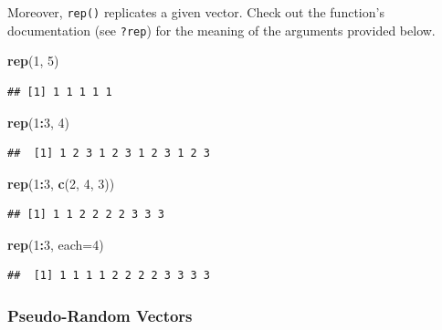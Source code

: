 \documentclass[10pt,b5paper,krantz1]{krantz}
\newenvironment{Shaded}{\begin{snugshade}}{\end{snugshade}}
\newcommand{\DataTypeTok}[1]{\textcolor[rgb]{0.27,0.27,0.27}{#1}}
\newcommand{\DecValTok}[1]{\textcolor[rgb]{0.06,0.06,0.06}{#1}}
\newcommand{\KeywordTok}[1]{\textcolor[rgb]{0.27,0.27,0.27}{\textbf{#1}}}
\newcommand{\NormalTok}[1]{#1}
\newcommand{\OperatorTok}[1]{\textcolor[rgb]{0.43,0.43,0.43}{\textbf{#1}}}
\begin{document}
Moreover, \texttt{rep()} replicates a given vector.
Check out the function's documentation (see \texttt{?rep}) for
the meaning of the arguments provided below.

\begin{Shaded}
\begin{Highlighting}[]
\KeywordTok{rep}\NormalTok{(}\DecValTok{1}\NormalTok{, }\DecValTok{5}\NormalTok{)}
\end{Highlighting}
\end{Shaded}

\begin{verbatim}
## [1] 1 1 1 1 1
\end{verbatim}

\begin{Shaded}
\begin{Highlighting}[]
\KeywordTok{rep}\NormalTok{(}\DecValTok{1}\OperatorTok{:}\DecValTok{3}\NormalTok{, }\DecValTok{4}\NormalTok{)}
\end{Highlighting}
\end{Shaded}

\begin{verbatim}
##  [1] 1 2 3 1 2 3 1 2 3 1 2 3
\end{verbatim}

\begin{Shaded}
\begin{Highlighting}[]
\KeywordTok{rep}\NormalTok{(}\DecValTok{1}\OperatorTok{:}\DecValTok{3}\NormalTok{, }\KeywordTok{c}\NormalTok{(}\DecValTok{2}\NormalTok{, }\DecValTok{4}\NormalTok{, }\DecValTok{3}\NormalTok{))}
\end{Highlighting}
\end{Shaded}

\begin{verbatim}
## [1] 1 1 2 2 2 2 3 3 3
\end{verbatim}

\begin{Shaded}
\begin{Highlighting}[]
\KeywordTok{rep}\NormalTok{(}\DecValTok{1}\OperatorTok{:}\DecValTok{3}\NormalTok{, }\DataTypeTok{each=}\DecValTok{4}\NormalTok{)}
\end{Highlighting}
\end{Shaded}

\begin{verbatim}
##  [1] 1 1 1 1 2 2 2 2 3 3 3 3
\end{verbatim}

\hypertarget{pseudo-random-vectors}{%
\subsubsection{Pseudo-Random Vectors}\label{pseudo-random-vectors}}
\end{document}
